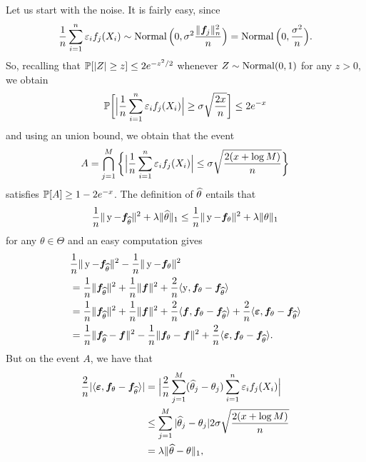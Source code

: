 Let us start with the noise. It is fairly easy, since
\begin{equation*}
	\frac 1n \sum_{i=1}^n \eps_i f_j(X_i) \sim 
	\nor\Big( 0, \sigma^2 \frac{\norm{\bf_j}_n^2}{n} \Big) 
	= \nor\Big( 0, \frac{\sigma^2}{n} \Big).
\end{equation*}
So, recalling that $\P[|Z| \geq z] \leq 2e^{-z^2 / 2}$ whenever $Z \sim \nor(0, 1)$ for any $z > 0$,%
we obtain
\begin{equation*}
	\P \bigg[ \Big| \frac 1n \sum_{i=1}^n \eps_i f_j(X_i) \Big| \geq \sigma \sqrt{\frac{2 x}{n}} \bigg] \leq 2 e^{-x}
\end{equation*}
and using an union bound, we obtain that the event
\begin{equation*}
	A = \bigcap_{j=1}^M \bigg\{ \Big| \frac 1n \sum_{i=1}^n \eps_i f_j(X_i) \Big| \leq \sigma \sqrt{\frac{2 (x + \log M)}{n}} \bigg\}
\end{equation*}
satisfies $\P[A] \geq 1 - 2e^{-x}$.
The definition of $\wh \theta$ entails that
\begin{equation}
	\label{eq:proof-oracle-slow-step1}
	\frac 1n  \norm{\by - \bf_{\wh \theta}}^2 + \lambda \norm{\wh \theta}_1 
	\leq \frac 1n  \norm{\by - \bf_\theta}^2 + \lambda \norm{\theta}_1
\end{equation}
for any $\theta \in \Theta$ and an easy computation gives
\begin{equation}
	\label{eq:proof-oracle-slow-step2}
	\begin{split}
	&\frac 1n \norm{\by - \bf_{\wh \theta}}^2 - \frac 1n \norm{\by - \bf_\theta}^2 \\
	&= \frac 1n  \norm{\bf_{\wh \theta}}^2 + \frac 1n  \norm{\bf}^2 + \frac 2n  \inr{\by, \bf_{\theta} - \bf_{\wh \theta}} \\
	&= \frac 1n \norm{\bf_{\wh \theta}}^2 + \frac 1n \norm{\bf}^2 + \frac 2n  \inr{\bf, \bf_{\theta} - \bf_{\wh \theta}} + \frac 2n  \inr{\beps, \bf_{\theta} - \bf_{\wh \theta}} \\
	&= \frac 1n \norm{\bf_{\wh \theta} - \bf}^2 - \frac 1n \norm{\bf_\theta - \bf}^2 + 
	\frac 2n  \inr{\beps, \bf_{\theta} - \bf_{\wh \theta}}.
	\end{split}
\end{equation}
But on the event $A$, we have that
\begin{equation}
	\label{eq:proof-oracle-slow-step3}
	\begin{split}
	\frac 2n | \inr{\beps, \bf_{\theta} - \bf_{\wh \theta}} | 
	&= \Big| \frac 2n \sum_{j=1}^M (\wh \theta_j - \theta_j ) 
	\sum_{i=1}^n \eps_i f_j(X_i) \Big| \\
	&\leq \sum_{j=1}^M | \wh \theta_j - \theta_j | 2 \sigma \sqrt{\frac{2 (x + \log M)}{n}} \\
	&= \lambda \norm{\wh \theta - \theta}_1,	
	\end{split}
\end{equation}
